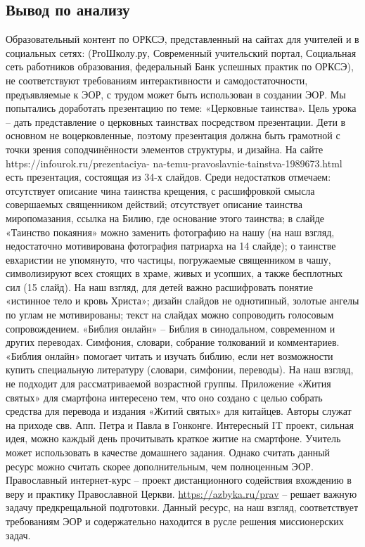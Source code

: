 \subsection{Вывод по анализу}
Образовательный контент по ОРКСЭ, представленный на сайтах для учителей и в социальных сетях: (РгоШколу.ру, Современный учительский портал, Социальная сеть работников образования, федеральный Банк успешных практик по ОРКСЭ), не соответствуют требованиям интерактивности и самодостаточности, предъявляемые к ЭОР, с трудом может быть использован в создании ЭОР. 
Мы попытались доработать презентацию по теме: «Церковные таинства». Цель урока – дать представление о церковных таинствах посредством презентации. Дети в основном не воцерковленные, поэтому презентация должна быть грамотной с точки зрения соподчинённости элементов структуры, и дизайна. На сайте https://infourok.ru/prezentaciya- na-temu-pravoslavnie-tainstva-1989673.html есть презентация, состоящая из 34-х слайдов. Среди недостатков отмечаем:
отсутствует описание чина таинства крещения, с расшифровкой смысла совершаемых священником действий;
отсутствует описание таинства миропомазания, ссылка на Билию, где основание этого таинства;
в слайде «Таинство покаяния» можно заменить фотографию на нашу (на наш взгляд, недостаточно мотивирована фотография патриарха на 14 слайде);
о таинстве евхаристии не упомянуто, что частицы, погружаемые священником в чашу, символизируют всех стоящих в храме, живых и усопших, а также бесплотных сил (15 слайд). На наш взгляд, для детей важно расшифровать понятие «истинное тело и кровь Христа»;
дизайн слайдов не однотипный, золотые ангелы по углам не мотивированы;
текст на слайдах можно сопроводить голосовым сопровождением.
«Библия онлайн» – Библия в синодальном, современном и других переводах. Симфония, словари, собрание толкований и комментариев. «Библия онлайн» помогает читать и изучать библию, если нет возможности купить специальную литературу (словари, симфонии, переводы). На наш взгляд, не подходит для рассматриваемой возрастной группы.
Приложение «Жития святых» для смартфона интересено тем, что оно создано с целью собрать средства для перевода и издания «Житий святых» для китайцев. Авторы служат на приходе свв. Апп. Петра и Павла в Гонконге. Интересный IT проект, сильная идея, можно каждый день прочитывать краткое житие на смартфоне. Учитель может использовать в качестве домашнего задания. Однако считать данный ресурс можно считать скорее дополнительным, чем полноценным ЭОР.
Православный интернет-курс – проект дистанционного содействия вхождению в веру и практику Православной Церкви. \url{https://azbyka.ru/prav} – решает важную задачу предкрещальной подготовки. Данный ресурс, на наш взгляд, соответствует требованиям ЭОР и содержательно находится в русле решения миссионерских задач.

